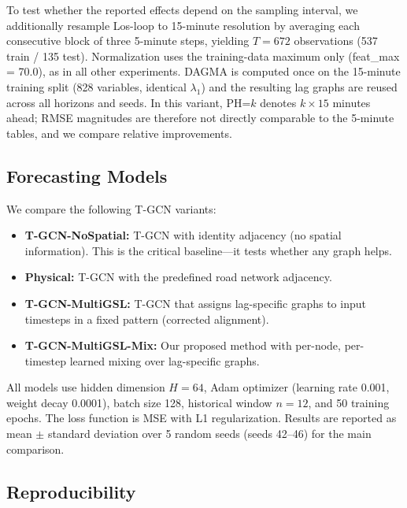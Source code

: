 To test whether the reported effects depend on the sampling interval, we additionally resample Los-loop to 15-minute resolution by averaging each consecutive block of three 5-minute steps, yielding $T=672$ observations (537 train / 135 test). Normalization uses the training-data maximum only (feat\_max = 70.0), as in all other experiments. DAGMA is computed once on the 15-minute training split (828 variables, identical $\lambda_1$) and the resulting lag graphs are reused across all horizons and seeds. In this variant, PH=$k$ denotes $k \times 15$ minutes ahead; RMSE magnitudes are therefore not directly comparable to the 5-minute tables, and we compare relative improvements.

\subsection{Forecasting Models}

We compare the following T-GCN variants:

\begin{itemize}
    \item \textbf{T-GCN-NoSpatial:} T-GCN with identity adjacency (no spatial information). This is the critical baseline---it tests whether any graph helps.
    \item \textbf{Physical:} T-GCN with the predefined road network adjacency.
    \item \textbf{T-GCN-MultiGSL:} T-GCN that assigns lag-specific graphs to input timesteps in a fixed pattern (corrected alignment).
    \item \textbf{T-GCN-MultiGSL-Mix:} Our proposed method with per-node, per-timestep learned mixing over lag-specific graphs.
\end{itemize}

All models use hidden dimension $H=64$, Adam optimizer (learning rate 0.001, weight decay 0.0001), batch size 128, historical window $n=12$, and 50 training epochs. The loss function is MSE with L1 regularization. Results are reported as mean $\pm$ standard deviation over 5 random seeds (seeds 42--46) for the main comparison.

\subsection{Reproducibility}\label{sec:reproducibility}

